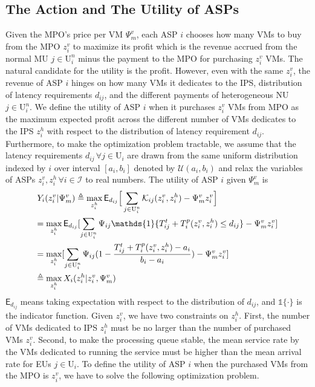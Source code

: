 \documentclass[conference]{IEEEtran}
\begin{document}
\subsection{The Action and The Utility of ASPs}
Given the MPO's price per VM $\Psi_m^v$, each ASP $i$ chooses how many VMs to buy from the MPO $z_i^v$ to maximize its profit which is the revenue accrued from the normal MU $j \in \mathrm{U}_i^n$ minus the payment to the MPO for purchasing $z_i^v$ VMs. The natural candidate for the utility is the profit. However, even with the same $z_i^v$, the revenue of ASP $i$ hinges on how many VMs it dedicates to the IPS, distribution of latency requirements $d_{ij}$, and the different payments of heterogeneous NU $j \in \mathrm{U}_i^n$. We define the utility of ASP $i$ when it purchases $z_i^v$ VMs from MPO as the maximum expected profit across the different number of VMs dedicates to the IPS $z_i^h$ with respect to the distribution of latency requirement $d_{ij}$. Furthermore, to make the optimization problem tractable, we assume that the latency requirements $d_{ij} \, \forall j \in \mathrm{U}_i$ are drawn from the same uniform distribution indexed by $i$ over interval $[a_i, b_i]$ denoted by $\mathcal{U}(a_i,b_i)$ and relax the variables of ASPs $z_i^v, z_i^h \, \forall i \in \mathcal{I}$ to real numbers. The utility of ASP $i$ given $\Psi_m^v$ is
\begin{align}
&Y_i(z_i^v|\Psi_m^v) \triangleq \max_{z_i^h} \mathsf{E}_{d_{ij}}\Big[\sum_{j \in \mathrm{U}_i^n} \mathcal{K}_{ij}(z_i^v, z_i^h) - \Psi_m^v z_i^v\Big] \\ 
&\hspace*{-1mm}=\max_{z_i^h} \mathsf{E}_{d_{ij}}[\sum_{j \in \mathrm{U}_i^n}\Psi_{ij}\mathds{1}\{T_{ij}^t + T_i^p(z_i^v, z_i^h) \leq d_{ij}\} - \Psi_m^vz_i^v] \nonumber \\ 
&\hspace*{-1mm}=\max_{z_i^h} [\sum_{j \in \mathrm{U}_i^n}\Psi_{ij}(1-\frac{T_{ij}^t + T_i^p(z_i^v, z_i^h)-a_i}{b_i-a_i}) - \Psi_m^vz_i^v] \label{eqn:asp_def_subobjective_unfold} \\
&\hspace*{-1mm}\triangleq \max_{z_i^h} X_i(z_i^h|z_i^v,\Psi_m^v) \label{eqn:asp_def_subobjective}
\end{align}
$\mathsf{E}_{d_{ij}}$ means taking expectation with respect to the distribution of $d_{ij}$, and $\mathds{1}\{\cdot\}$ is the indicator function. Given $z_i^v$, we have two constraints on $z_i^h$. First, the number of VMs dedicated to IPS $z_i^h$ must be no larger than the number of purchased VMs $z_i^v$. Second, to make the processing queue stable, the mean service rate by the VMs dedicated to running the service must be higher than the mean arrival rate for EUs $j \in \mathrm{U}_i$. To define the utility of ASP $i$ when the purchased VMs from the MPO is $z_i^v$, we have to solve the following optimization problem. 
\end{document}
